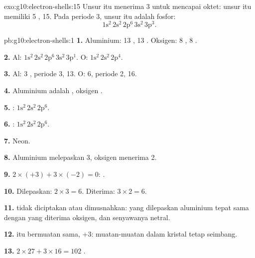 \begin{solution}{exo:g10:electron-shells:15}
Unsur itu menerima 3  untuk mencapai oktet: unsur itu memiliki 5
,  15. Pada periode 3, unsur itu adalah fosfor:
\[ 1\mathrm{s}^2\,2\mathrm{s}^2\,2\mathrm{p}^6\,3\mathrm{s}^2\,3\mathrm{p}^3. \]
\end{solution}

\begin{solution}{pb:g10:electron-shells:1}
\textbf{1.} Aluminium: 13 , 13 . Oksigen: 8 , 8
.

\textbf{2.} Al: $1\mathrm{s}^2\,2\mathrm{s}^2\,2\mathrm{p}^6\,3\mathrm{s}^2\,3\mathrm{p}^1$.
O: $1\mathrm{s}^2\,2\mathrm{s}^2\,2\mathrm{p}^4$.

\textbf{3.} Al: 3 , periode 3,  13. O: 6,
periode 2,  16.

\textbf{4.} Aluminium adalah , oksigen .

\textbf{5.} : $1\mathrm{s}^2\,2\mathrm{s}^2\,2\mathrm{p}^6$.

\textbf{6.} : $1\mathrm{s}^2\,2\mathrm{s}^2\,2\mathrm{p}^6$.

\textbf{7.} Neon.

\textbf{8.} Aluminium melepaskan 3, oksigen menerima 2.

\textbf{9.} $2 \times (+3) + 3 \times (-2) = 0$: .

\textbf{10.} Dilepaskan: $2 \times 3 = 6$. Diterima: $3 \times 2 = 6$.

\textbf{11.}  tidak diciptakan atau dimusnahkan:  yang
dilepaskan aluminium tepat sama dengan yang diterima oksigen, dan
senyawanya netral.

\textbf{12.}  itu bermuatan sama, $+3$: muatan-muatan dalam kristal
tetap seimbang.

\textbf{13.} $2 \times 27 + 3 \times 16 = 102$ .


\end{solution}
